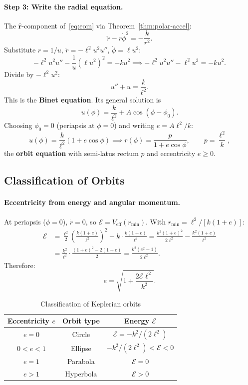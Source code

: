 \documentclass[12pt,a4paper]{article}
\theoremstyle{plain}
\theoremstyle{definition}
\theoremstyle{remark}
\newcommand{\er}{\hat{\mathbf{r}}}
\begin{document}
\paragraph{Step 3: Write the radial equation.} The $\er$-component of~\eqref{eq:eom} via Theorem~\ref{thm:polar-accel}:
\[
  \ddot{r} - r\dot\phi^2 = -\frac{k}{r^2}.
\]
Substitute $r=1/u$, $\ddot{r}=-\ell^2u^2u''$, $\dot\phi=\ell u^2$:
\[
  -\ell^2u^2u'' - \frac{1}{u}(\ell u^2)^2 = -ku^2
  \implies
  -\ell^2u^2u'' - \ell^2u^3 = -ku^2.
\]
Divide by $-\ell^2u^2$:
\begin{equation}\label{eq:binet}
  \boxed{u'' + u = \frac{k}{\ell^2}.}
\end{equation}
This is the \textbf{Binet equation}. Its general solution is
\[
  u(\phi) = \frac{k}{\ell^2} + A\cos(\phi-\phi_0).
\]
Choosing $\phi_0=0$ (periapsis at $\phi=0$) and writing $e = A\ell^2/k$:
\[
  u(\phi) = \frac{k}{\ell^2}(1+e\cos\phi)
  \implies
  \boxed{r(\phi) = \frac{p}{1+e\cos\phi}, \qquad p = \frac{\ell^2}{k},}
\]
the \textbf{orbit equation} with semi-latus rectum $p$ and eccentricity $e\geq0$.

\subsection{Classification of Orbits}

\paragraph{Eccentricity from energy and angular momentum.}
At periapsis ($\phi=0$), $\dot{r}=0$, so $\mathcal{E} = V_{\mathrm{eff}}(r_{\min})$. With $r_{\min}=\ell^2/[k(1+e)]$:
\begin{align*}
  \mathcal{E}
  &= \frac{\ell^2}{2}\!\left(\frac{k(1+e)}{\ell^2}\right)^2 - k\cdot\frac{k(1+e)}{\ell^2}
   = \frac{k^2(1+e)^2}{2\ell^2} - \frac{k^2(1+e)}{\ell^2} \\
  &= \frac{k^2}{\ell^2}\cdot\frac{(1+e)^2-2(1+e)}{2}
   = \frac{k^2(e^2-1)}{2\ell^2}.
\end{align*}
Therefore:
\begin{equation}\label{eq:ecc}
  \boxed{e = \sqrt{1 + \frac{2\mathcal{E}\ell^2}{k^2}}.}
\end{equation}

\begin{table}[h]
\centering
\caption{Classification of Keplerian orbits}
\begin{tabular}{ccc}
  \toprule
  Eccentricity $e$ & Orbit type & Energy $\mathcal{E}$\\
  \midrule
  $e=0$ & Circle & $\mathcal{E} = -k^2/(2\ell^2)$\\
  $0<e<1$ & Ellipse & $-k^2/(2\ell^2)<\mathcal{E}<0$\\
  $e=1$ & Parabola & $\mathcal{E}=0$\\
  $e>1$ & Hyperbola & $\mathcal{E}>0$\\
  \bottomrule
\end{tabular}
\end{table}
\end{document}
